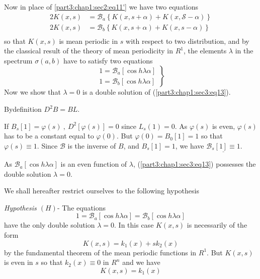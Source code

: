 Now in place of \ref{part3:chap1:sec2:eq11'} we have two equations
\begin{align*}
  2 K(x, s) & = \mathscr{B}_a \left\{K(x, s+\alpha ) + K(x,
  \mathscr{S}-\alpha) \right\} \\ 
  2 K(x, s) & = \mathscr{B}_b \left\{K(x, s +\alpha ) + K(x, s -
  \alpha ) \right\} \\ 
\end{align*}
so that $K(x, s)$ is mean periodic in $s$ with respect to two
distribution, and by the classical result of the theory of mean
periodicity in $R^1$, the elements $\lambda$ in the spectrum
$\sigma(a, b)$ have to satisfy two equations 
\begin{equation*}
  \left.
  \tag{13}\label{part3:chap1:sec3:eq13}
  \begin{aligned}
    1= \mathscr{B}_a [\cos h \lambda \alpha ] \\
    1= \mathscr{B}_b [\cos h \lambda \alpha ] 
  \end{aligned}
  \right\}
\end{equation*}
Now we show that $\lambda = 0$ is a double solution of
(\ref{part3:chap1:sec3:eq13}).

By\pageoriginale definition $D^2 B = BL$.

If $B_s [1] = \varphi(s)~,~D^2[\varphi (s)] = 0$ since $L_s (1) = 0$.
As $\varphi(s)$ is even, $\varphi(s)$ has to be a constant equal to
$\varphi(0)$. But $\varphi(0)=B_0[1]=1$ so that $\varphi(s) \equiv
1$. Since $\mathscr{B}$ is the inverse of $B$, and $B_s[1]=1$, we have
$\underline{\mathscr{B}_s[1]\equiv 1}$. 

As $\mathscr{B}_a [\cos h \lambda \alpha]$ is an even function of
$\lambda$, (\ref{part3:chap1:sec3:eq13}) possesses the double solution
$\lambda =0$.  

We shall hereafter restrict ourselves to the following hypothesis

\noindent
\textit{Hypothesis $(H)$}- The equations
$$
1 = \mathscr{B}_a [ \cos h \lambda \alpha ] = \mathscr{B}_b [ \cos h
  \lambda \alpha] 
$$
have the only double solution $\lambda =0$. In this case $K(x, s)$ is
necessarily of the form 
\begin{equation*}
  K(x,s) = k_1(x) + sk_2(x) \tag{14}\label{part3:chap1:sec3:eq14}
\end{equation*}
by the fundamental theorem of the mean periodic functions in
$R^1$. But $K(x, s)$ is even in $s$ so that $k_2(x) \equiv 0$ in $R^n$
and we have 
\begin{equation*}
  K(x, s) = k_1(x) \tag{15}\label{part3:chap1:sec3:eq15}
\end{equation*}

